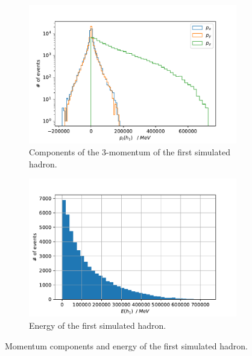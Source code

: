 \begin{figure}[H]
    \centering
    \begin{subfigure}{0.49\textwidth}
      \includegraphics[width=\textwidth]{plots/momenta_H1_sim.pdf}
      \caption{Components of the 3-momentum of the first simulated hadron.}
      \label{fig:ProbPi}
    \end{subfigure}
    \begin{subfigure}{0.49\textwidth}
      \includegraphics[width=\textwidth]{plots/energy_H1_sim.pdf}
      \caption{Energy of the first simulated hadron.}
      \label{fig:ProbK}
    \end{subfigure}
    \caption{Momentum components and energy of the first simulated hadron.}
    \label{f1}
    \end{figure}

